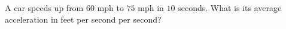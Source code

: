 A car speeds up from $60$ mph to $75$ mph in $10$ seconds. What is its average acceleration in feet per second per second?
